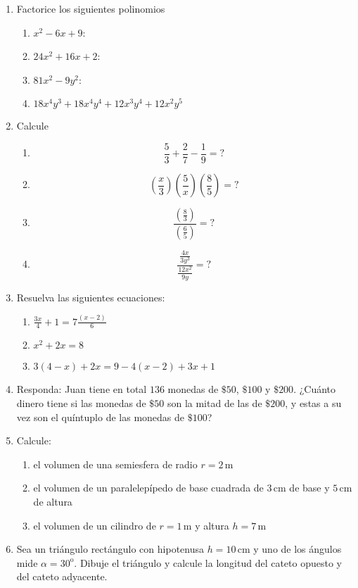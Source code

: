 \documentclass[a4paper,12pt]{article}
\begin{document}
\begin{enumerate}
  \item Factorice los siguientes polinomios
    \begin{enumerate}
      \item $x^2 - 6x +9$:
      \item $24 x^2 + 16 x + 2$:
      \item $81 x^2 - 9 y^2$:
      \item $18 x^4 y^3 + 18 x^4 y^4 + 12 x^3 y^4 + 12 x^2 y^5$
    \end{enumerate}

  \item Calcule
    \begin{enumerate}
      \item
        \begin{equation}
          \frac53 + \frac27 - \frac19 = ? \nonumber
        \end{equation}
      \item
        \begin{equation}
          \left ( \frac x3 \right ) \left ( \frac5x \right ) \left ( \frac85 \right ) = ? \nonumber
        \end{equation}
      \item 
        \begin{equation}
          \frac{\left ( \frac{8}{3}\right )}{\left ( \frac{6}{5}\right )} = ? \nonumber
        \end{equation}
      \item 
        \begin{equation}
          \frac{\frac{4x}{3y^3}}{\frac{12x^2}{9y}} = ? \nonumber 
        \end{equation}
    \end{enumerate}
  \item Resuelva las siguientes ecuaciones:
    \begin{enumerate}
      \item $\frac{3x}{4} + 1 = 7 \frac{(x-2)}{6}$
      \item $x^2 + 2x = 8$
      \item $3(4 - x) + 2x = 9 - 4(x - 2) + 3x + 1$
    \end{enumerate}
  \item Responda: Juan tiene en total $136$ monedas de $\$50$, $\$100$ y $\$200$. ¿Cuánto dinero tiene si las monedas de $\$50$ son la mitad de las de $\$200$, y estas a su vez son el quíntuplo de las monedas de $\$100$?
  \item Calcule: 
    \begin{enumerate}
      \item el volumen de una semiesfera de radio $r=2$\,m
      \item el volumen de un paralelepípedo de base cuadrada de $3$\,cm de base y $5$\,cm de altura
      \item el volumen de un cilindro de $r=1$\,m y altura $h=7$\,m
    \end{enumerate}
  \item Sea un triángulo rectángulo con hipotenusa $h=10$\,cm y uno de los ángulos mide $\alpha=30^\mathrm{o}$. Dibuje el triángulo y calcule la longitud del cateto opuesto y del cateto adyacente.
    

\end{enumerate}
\end{document}
